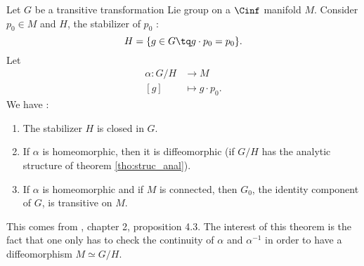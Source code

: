 \begin{proposition}
Let $G$ be a transitive transformation Lie group on a $\Cinf$ manifold $M$. Consider $p_0\in M$ and $H$, the stabilizer of $p_{0}$ :
\[
  H=\{ g\in G\tq g\cdot p_0=p_0 \}.
\]
Let
\begin{equation}
\begin{aligned}
 \alpha\colon G/H&\to M \\ 
[g]&\mapsto g\cdot p_{0}.
\end{aligned}
\end{equation}
We have :
\begin{enumerate}
\item The stabilizer $H$ is closed in $G$.
\item If $\alpha$ is homeomorphic, then it is diffeomorphic (if $G/H$ has the analytic structure of theorem \ref{tho:struc_anal}).
\item If $\alpha$ is homeomorphic and if $M$ is connected, then $G_0$, the identity component of $G$, is transitive on $M$.
\end{enumerate}
\label{propHelgason4.3}
\end{proposition}

This comes from \cite{Helgason}, chapter 2, proposition 4.3. The interest of this theorem is the fact that one only has to check the continuity of $\alpha$ and $\alpha^{-1}$ in order to have a diffeomorphism $M\simeq G/H$.

